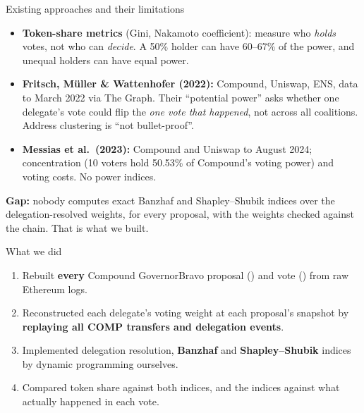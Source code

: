 \documentclass[aspectratio=169,11pt]{beamer}
\begin{document}
\begin{frame}{Existing approaches and their limitations}
  \small
  \begin{itemize}
    \item \textbf{Token-share metrics} (Gini, Nakamoto coefficient): measure who \emph{holds} votes, not who can \emph{decide}. A 50\% holder can have 60--67\% of the power, and unequal holders can have equal power.
    \item \textbf{Fritsch, M\"uller \& Wattenhofer (2022):} Compound, Uniswap, ENS, data to March 2022 via The Graph. Their ``potential power'' asks whether one delegate's vote could flip the \emph{one vote that happened}, not across all coalitions. Address clustering is ``not bullet-proof''.
    \item \textbf{Messias et al.\ (2023):} Compound and Uniswap to August 2024; concentration (10 voters hold 50.53\% of Compound's voting power) and voting costs. No power indices.
  \end{itemize}
  \vspace{0.5em}
  \textbf{Gap:} nobody computes exact Banzhaf and Shapley--Shubik indices over the delegation-resolved weights, for every proposal, with the weights checked against the chain. That is what we built.
\end{frame}

\begin{frame}{What we did}
  \begin{enumerate}
    \item Rebuilt \textbf{every} Compound GovernorBravo proposal (\NProposals) and vote (\NVotes) from raw Ethereum logs.
    \item Reconstructed each delegate's voting weight at each proposal's snapshot by \textbf{replaying all \NTransfers{} COMP transfers and \NDelegationEvents{} delegation events}.
    \item Implemented delegation resolution, \textbf{Banzhaf} and \textbf{Shapley--Shubik} indices by dynamic programming ourselves.
    \item Compared token share against both indices, and the indices against what actually happened in each vote.
  \end{enumerate}
  \vspace{0.8em}
\end{frame}
\end{document}

